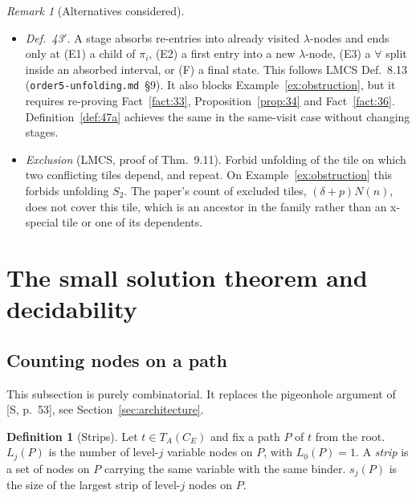 \documentclass[11pt]{article}
\newcommand{\CE}{C_E}
\theoremstyle{plain}
\theoremstyle{definition}
\newtheorem{definition}[theorem]{Definition}
\theoremstyle{remark}
\newtheorem{remark}[theorem]{Remark}
\begin{document}
\begin{remark}[Alternatives considered]
\begin{itemize}
\item \emph{Def.~43$'$.} A stage absorbs re-entries into already visited
  $\lambda$-nodes and ends only at (E1) a child of $\pi_i$, (E2) a
  first entry into a new $\lambda$-node, (E3) a $\forall$ split inside
  an absorbed interval, or (F) a final state.  This follows LMCS
  Def.~8.13 (\texttt{order5-unfolding.md}~\S9).  It also blocks
  Example~\ref{ex:obstruction}, but it requires re-proving
  Fact~\ref{fact:33}, Proposition~\ref{prop:34} and Fact~\ref{fact:36}.
  Definition~\ref{def:47a} achieves the same in the same-visit case
  without changing stages.
\item \emph{Exclusion} (LMCS, proof of Thm.~9.11).  Forbid unfolding of
  the tile on which two conflicting tiles depend, and repeat.  On
  Example~\ref{ex:obstruction} this forbids unfolding $S_2$.  The
  paper's count of excluded tiles, $(\delta+p)N(n)$, does not cover this
  tile, which is an ancestor in the family rather than an x-special
  tile or one of its dependents.
\end{itemize}
\end{remark}

\section{The small solution theorem and decidability}\label{sec:thm37}

\subsection{Counting nodes on a path}\label{sec:pathcount}

This subsection is purely combinatorial.  It replaces the pigeonhole
argument of [S, p.~53], see Section~\ref{sec:architecture}.

\begin{definition}[Strips]\label{def:strip}
Let $t\in T_A(\CE)$ and fix a path $P$ of $t$ from the root.  $L_j(P)$ is the number of
level-$j$ variable nodes on $P$, with $L_0(P)=1$.  A \emph{strip} is a
set of nodes on $P$ carrying the same variable with the same binder.
$s_j(P)$ is the size of the largest strip of level-$j$ nodes on $P$.
\end{definition}
\end{document}
